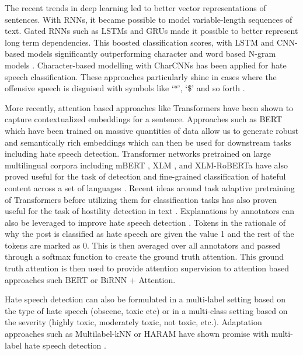 \documentclass[11pt,a4paper]{article}
\begin{document}
The recent trends in deep learning led to better vector representations of sentences. With RNNs, it became possible to model variable-length sequences of text. Gated RNNs such as LSTMs \cite{sutskever2014sequence} and GRUs \cite{chung2014empirical} made it possible to better represent long term dependencies. This boosted classification scores, with LSTM and CNN-based models significantly outperforming character and word based N-gram models \cite{badjatiya2017dlhate}. Character-based modelling with CharCNNs \cite{zhang2015character} has been applied for hate speech classification. These approaches particularly shine in cases where the offensive speech is disguised with symbols like `*', `\$' and so forth \cite{character-abuse}.

More recently, attention based approaches like Transformers \cite{vaswani2017attention} have been shown to capture contextualized embeddings for a sentence. Approaches such as BERT \cite{devlin2018bert} which have been trained on massive quantities of data allow us to generate robust and semantically rich embeddings which can then be used for downstream tasks including hate speech detection. Transformer networks pretrained on large multilingual corpora including mBERT \cite{devlin2018bert}, XLM \cite{xlm}, and XLM-RoBERTa \cite{xlmr} have also proved useful for the task of detection and fine-grained classification of hateful content across a set of languages \cite{hasoc-sayar}. Recent ideas around task adaptive pretraining of Transformers \cite{tapt} before utilizing them for classification tasks has also proven useful for the task of hostility detection in text \cite{tapt-tathagata}. 
Explanations by annotators can also be leveraged to improve hate speech detection \cite{mathew2020hatexplain}. Tokens in the rationale of why the post is classified as hate speech are given the value 1 and the rest of the tokens are marked as 0. This is then averaged over all annotators and passed through a softmax function to create the ground truth attention. This ground truth attention is then used to provide attention supervision to attention based approaches such BERT or BiRNN + Attention. 

Hate speech detection can also be formulated in a multi-label setting based on the type of hate speech (obscene, toxic etc) or in a multi-class setting based on the severity (highly toxic, moderately toxic, not toxic, etc.). Adaptation approaches such as Multilabel-kNN \cite{zhang2007ml} or HARAM \cite{7395756} have shown promise with multi-label hate speech detection \cite{mollas2020ethos}.
\end{document}
